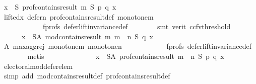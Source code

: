 \begin{isabellebody}
\ {\isachardoublequoteopen}{\isasymforall}x\ {\isasymin}\ S{\isachardot}{\kern0pt}\ prof{\isacharunderscore}{\kern0pt}contains{\isacharunderscore}{\kern0pt}result\ m\ S\ p\ q\ x{\isachardoublequoteclose}\isanewline
\ \ \ \ \ \ \isamarkupfalse%
\ lifted{\isacharunderscore}{\kern0pt}x\ defer{\isacharunderscore}{\kern0pt}n\ prof{\isacharunderscore}{\kern0pt}contains{\isacharunderscore}{\kern0pt}result{\isacharunderscore}{\kern0pt}def\ monotone{\isacharunderscore}{\kern0pt}m\isanewline
\ \ \ \ \ \ \ \ \ \ \ \ f{\isacharunderscore}{\kern0pt}profs\ defer{\isacharunderscore}{\kern0pt}lift{\isacharunderscore}{\kern0pt}invariance{\isacharunderscore}{\kern0pt}def\isanewline
\ \ \ \ \ \ \isamarkupfalse%
\ {\isacharparenleft}{\kern0pt}smt\ {\isacharparenleft}{\kern0pt}verit{\isacharcomma}{\kern0pt}\ ccfv{\isacharunderscore}{\kern0pt}threshold{\isacharparenright}{\kern0pt}{\isacharparenright}{\kern0pt}\isanewline
\ \ \ \ \isamarkupfalse%
\ \isamarkupfalse%
\isanewline
\ \ \ \ \ \ {\isachardoublequoteopen}{\isasymforall}x\ {\isasymin}\ S{\isacharminus}{\kern0pt}A{\isachardot}{\kern0pt}\ mod{\isacharunderscore}{\kern0pt}contains{\isacharunderscore}{\kern0pt}result\ m\ {\isacharparenleft}{\kern0pt}m\ {\isasymparallel}\isactrlsub {\isasymup}\ n{\isacharparenright}{\kern0pt}\ S\ q\ x{\isachardoublequoteclose}\isanewline
\ \ \ \ \ \ \isamarkupfalse%
\ A\ max{\isacharunderscore}{\kern0pt}agg{\isacharunderscore}{\kern0pt}rej{}\ monotone{\isacharunderscore}{\kern0pt}m\ monotone{\isacharunderscore}{\kern0pt}n\isanewline
\ \ \ \ \ \ \ \ \ \ \ \ f{\isacharunderscore}{\kern0pt}profs\ defer{\isacharunderscore}{\kern0pt}lift{\isacharunderscore}{\kern0pt}invariance{\isacharunderscore}{\kern0pt}def\isanewline
\ \ \ \ \ \ \isamarkupfalse%
\ metis\isanewline
\ \ \ \ \isamarkupfalse%
\ \isamarkupfalse%
\ {}{}{\isacharcolon}{\kern0pt}\isanewline
\ \ \ \ \ \ {\isachardoublequoteopen}{\isasymforall}x\ {\isasymin}\ S{\isacharminus}{\kern0pt}A{\isachardot}{\kern0pt}\ prof{\isacharunderscore}{\kern0pt}contains{\isacharunderscore}{\kern0pt}result\ {\isacharparenleft}{\kern0pt}m\ {\isasymparallel}\isactrlsub {\isasymup}\ n{\isacharparenright}{\kern0pt}\ S\ p\ q\ x{\isachardoublequoteclose}\isanewline
\ \ \ \ \ \ \isamarkupfalse%
\ electoral{\isacharunderscore}{\kern0pt}mod{\isacharunderscore}{\kern0pt}defer{\isacharunderscore}{\kern0pt}elem\isanewline
\ \ \ \ \ \ \isamarkupfalse%
\ {\isacharparenleft}{\kern0pt}simp\ add{\isacharcolon}{\kern0pt}\ mod{\isacharunderscore}{\kern0pt}contains{\isacharunderscore}{\kern0pt}result{\isacharunderscore}{\kern0pt}def\ prof{\isacharunderscore}{\kern0pt}contains{\isacharunderscore}{\kern0pt}result{\isacharunderscore}{\kern0pt}def{\isacharparenright}{\kern0pt}\isanewline

\end{isabellebody}
